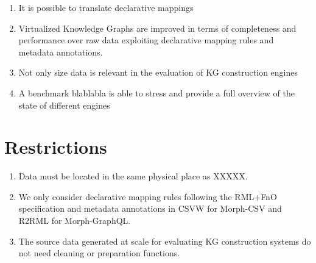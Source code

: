 \begin{enumerate}[label=\textbf{H{\arabic*}}]
    \item It is possible to translate declarative mappings
    \item Virtualized Knowledge Graphs are improved in terms of completeness and performance over raw data exploiting declarative mapping rules and metadata annotations.
    \item Not only size data is relevant in the evaluation of KG construction engines
    \item A benchmark blablabla is able to stress and provide a full overview of the state of different engines 
\end{enumerate}

\section{Restrictions}

\begin{enumerate}[label=\textbf{R{\arabic*}}]
    \item Data must be located in the same physical place as XXXXX.
    \item We only consider declarative mapping rules following the RML+FnO~\citep{de2017declarative} specification and metadata annotations in CSVW for Morph-CSV and R2RML for Morph-GraphQL.
    \item The source data generated at scale for evaluating KG construction systems do not need cleaning or preparation functions.
\end{enumerate}
